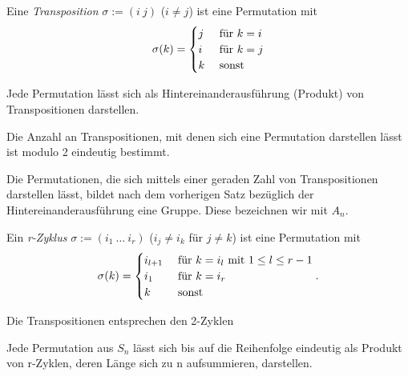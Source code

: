 \documentclass[10pt]{scrbook}
\begin{document}
\begin{Def}
Eine \emph{Transposition} $\sigma:=(i\ j)$ ($i\neq j$) ist eine Permutation mit
\begin{displaymath}
	\sigma(k)=
	\begin{cases}
	j & \textnormal{ für } k=i \\
	i & \textnormal{ für } k=j \\
	k & \textnormal{ sonst}
	\end{cases}
\end{displaymath}
\end{Def}

\begin{Le}
Jede Permutation lässt sich als Hintereinanderausführung (Produkt) von Transpositionen darstellen.
\end{Le}

\begin{Sa}
Die Anzahl an Transpositionen, mit denen sich eine Permutation darstellen lässt ist modulo 2 eindeutig bestimmt.
\end{Sa}

\begin{Def}
Die Permutationen, die sich mittels einer geraden Zahl von Transpositionen darstellen lässt, bildet nach dem vorherigen Satz bezüglich der Hintereinanderausführung eine Gruppe. Diese bezeichnen wir mit $A_n$.
\end{Def}

\begin{Def}
Ein \emph{r-Zyklus} $\sigma:=(i_1\ \ldots\ i_r)$ ($i_j\neq i_k$ für $j\neq k$) ist eine Permutation mit
\begin{displaymath}
	\sigma(k)=
	\begin{cases}
	i_{l+1} & \textnormal{ für } k=i_l \textnormal{ mit } 1\leq l \leq r-1 \\
	i_1 & \textnormal{ für } k=i_r \\
	k & \textnormal{ sonst}
	\end{cases}
.
\end{displaymath}
\end{Def}

\begin{Bem}
Die Transpositionen entsprechen den 2-Zyklen
\end{Bem}

\begin{Sa}
Jede Permutation aus $S_n$ lässt sich bis auf die Reihenfolge eindeutig als Produkt von r-Zyklen, deren Länge sich zu n aufsummieren, darstellen.
\end{Sa}
\end{document}
